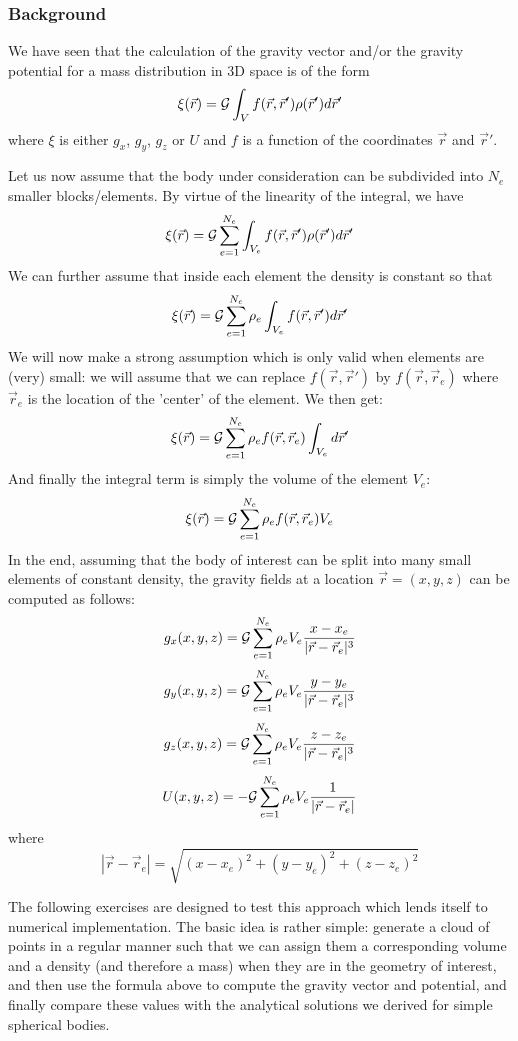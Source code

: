 




\subsubsection{Background}

We have seen that the calculation of the gravity vector and/or the gravity potential 
for a mass distribution in 3D space is of the form 
\[
\xi(\vec{r})= {\cal G}  \int_V f(\vec{r},\vec{r}') \rho(\vec{r}') d\vec{r}'
\]
where $\xi$ is either $g_x$, $g_y$, $g_z$ or $U$ and $f$ is a function of the coordinates $\vec{r}$
and $\vec{r}'$.

Let us now assume that the body under consideration can be subdivided into $N_e$ smaller blocks/elements.
By virtue of the linearity of the integral, we have
\[
\xi(\vec{r})={\cal G} \sum_{e=1}^{N_e} \int_{V_e} f(\vec{r},\vec{r}') \rho(\vec{r}') d\vec{r}'
\]
We can further assume that inside each element the density is constant so that 
\[
\xi(\vec{r})={\cal G} \sum_{e=1}^{N_e} \rho_e \int_{V_e} f(\vec{r},\vec{r}') d\vec{r}'
\]
We will now make a strong assumption which is only valid when elements are (very) small:
we will assume that we can replace $f(\vec{r},\vec{r}')$ by $f(\vec{r},\vec{r}_e)$
where $\vec{r}_e$ is the location of the 'center' of the element. We then get:
\[
\xi(\vec{r})= {\cal G}\sum_{e=1}^{N_e} \rho_e  f(\vec{r},\vec{r}_e) \int_{V_e}d\vec{r}'
\]
And finally the integral term is simply the volume of the element $V_e$:
\[
\xi(\vec{r})= {\cal G} \sum_{e=1}^{N_e} \rho_e  f(\vec{r},\vec{r}_e) V_e
\]
In the end, assuming that the body of interest can be split into many small 
elements of constant density, the gravity fields at a location $\vec{r}=(x,y,z)$
can be computed as follows:
\[
g_x(x,y,z) = {\cal G} \sum_{e=1}^{N_e} \rho_e V_e  \frac{x-x_e}{|\vec{r}-\vec{r}_e|^3}
\]
\[
g_y(x,y,z) = {\cal G} \sum_{e=1}^{N_e} \rho_e V_e  \frac{y-y_e}{|\vec{r}-\vec{r}_e|^3}
\]
\[
g_z(x,y,z) = {\cal G} \sum_{e=1}^{N_e} \rho_e V_e  \frac{z-z_e}{|\vec{r}-\vec{r}_e|^3}
\]
\[
U(x,y,z) = -{\cal G} \sum_{e=1}^{N_e} \rho_e V_e  \frac{1}{|\vec{r}-\vec{r}_e|}
\]
where 
\[
|\vec{r}-\vec{r}_e|=\sqrt{ (x-x_e)^2+(y-y_e)^2+(z-z_e)^2   }
\]

The following exercises are designed to test this approach which lends itself to 
numerical implementation. 
The basic idea is rather simple: generate a cloud of points in a regular manner such that 
we can assign them a corresponding volume and a density (and therefore a mass)
when they are in the geometry of interest, 
and then use the formula above to compute the gravity vector and potential, and finally 
compare these values with the analytical solutions we derived for simple spherical bodies. 


